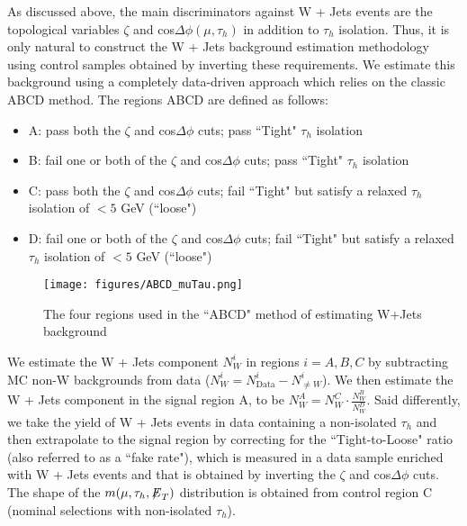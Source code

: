 As discussed above, the main discriminators against W + Jets events are the topological variables $\zeta$ and cos$\Delta\phi(\mu,\tau_{h})$ in addition to 
$\tau_{h}$ isolation. Thus, it is only natural to construct the W + Jets background estimation methodology using control samples obtained by inverting these 
requirements. We estimate this background using a completely data-driven approach which relies on the classic ABCD method. The regions ABCD are defined as 
follows:

\begin{itemize}
  \item A: pass both the $\zeta$ and cos$\Delta\phi$ cuts; pass ``Tight" $\tau_{h}$ isolation
  \item B: fail one or both of the $\zeta$ and cos$\Delta\phi$ cuts; pass ``Tight" $\tau_{h}$ isolation
  \item C: pass both the $\zeta$ and cos$\Delta\phi$ cuts; fail ``Tight" but satisfy a relaxed $\tau_{h}$ isolation of $< 5$ GeV (``loose")
  \item D: fail one or both of the $\zeta$ and cos$\Delta\phi$ cuts; fail ``Tight" but satisfy a relaxed $\tau_{h}$ isolation of $< 5$ GeV (``loose")
\end{itemize}

\begin{figure}
\centering
\label{fig:ABCD_muTau}
\texttt{[image: figures/ABCD\_muTau.png]}
\caption{The four regions used in the ``ABCD" method of estimating W+Jets background}
\end{figure}

We estimate the W + Jets component $N_{W}^{i}$ in regions $i=A,B,C$ by subtracting MC non-W backgrounds
from data ($N_{W}^{i}=N_{\textrm{Data}}^{i}-N_{\neq W}^{i}$). We then estimate the W + Jets component in the signal region A, to
be $N_{W}^{A} = N_{W}^{C} \cdot \frac{N_{W}^{B}}{N_{W}^{D}}$. Said differently, we take the yield of W + Jets events in data containing a non-isolated $\tau_{h}$ 
and then extrapolate to the signal region by correcting for the ``Tight-to-Loose" ratio (also referred to as a ``fake rate"), which is measured in a data sample 
enriched with W + Jets events and that is obtained by inverting the $\zeta$ and cos$\Delta\phi$ cuts. The shape of the $m(\mu,\tau_{h},{\not\mathrel{E}}_T)$ distribution is 
obtained from control region C (nominal selections with non-isolated $\tau_{h}$).

